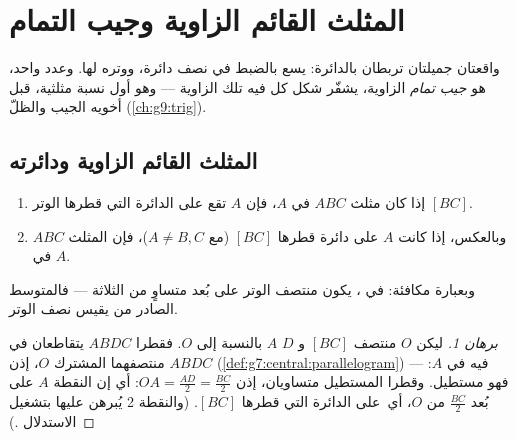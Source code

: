 \chapter{المثلث القائم الزاوية وجيب التمام}\label{ch:g8:cosine}

واقعتان جميلتان تربطان  بالدائرة:  يسع بالضبط في نصف دائرة، ووتره
 لها. وعدد واحد، هو \emph{جيب تمام} الزاوية، يشفّر
شكل كل  فيه تلك الزاوية --- وهو أول
نسبة مثلثية، قبل أخويه الجيب والظلّ
(\cref{ch:g9:trig}).

\section{المثلث القائم الزاوية ودائرته}

\begin{theorem}\label{thm:g8:cosine:circle}
\begin{enumerate}
  \item إذا كان مثلث $ABC$  في $A$، فإن $A$ تقع على
        الدائرة التي قطرها الوتر $[BC]$.
  \item وبالعكس، إذا كانت $A$ على دائرة قطرها $[BC]$ (مع
        $A \neq B, C$)، فإن المثلث $ABC$  في
        $A$.
\end{enumerate}
وبعبارة مكافئة: في ، يكون منتصف الوتر
على بُعد متساوٍ من  الثلاثة --- فالمتوسط الصادر من
 يقيس نصف الوتر.
\end{theorem}

\begin{proof}[برهان 1]
ليكن $O$ منتصف $[BC]$ و $D$  $A$ بالنسبة إلى
$O$. فقطرا $ABDC$ يتقاطعان في منتصفهما المشترك $O$، إذن
$ABDC$  (\cref{def:g7:central:parallelogram}) ---
فيه  في $A$: فهو مستطيل. وقطرا
المستطيل متساويان، إذن $OA = \frac{AD}{2} = \frac{BC}{2}$: أي إن
النقطة $A$ على بُعد $\frac{BC}{2}$ من $O$، أي\ على الدائرة
التي قطرها $[BC]$. (والنقطة 2 يُبرهن عليها بتشغيل الاستدلال
.)
\end{proof}

